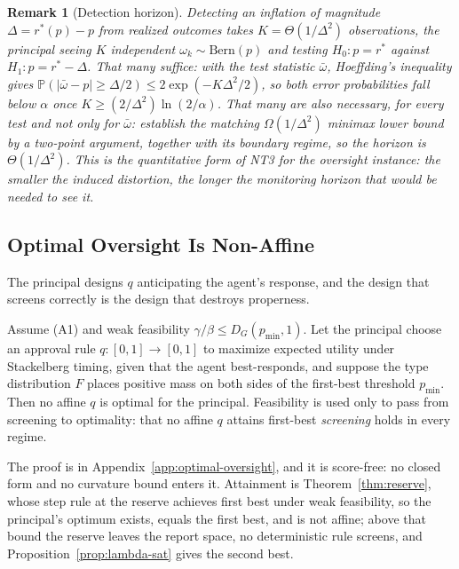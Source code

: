 \documentclass[acmsmall,nonacm,screen]{acmart}
\theoremstyle{acmplain}%
\theoremstyle{acmdefinition}%
\newtheorem{remark}[theorem]{Remark}%
\newcommand{\Prob}{\mathbb{P}}
\numberwithin{equation}{section}
\begin{document}
\begin{remark}[Detection horizon]\label{rem:detection-horizon}
Detecting an inflation of magnitude $\Delta = r^*(p) - p$ from realized outcomes takes $K = \Theta(1/\Delta^2)$ observations, the principal seeing $K$ independent $\omega_k \sim \mathrm{Bern}(p)$ and testing $H_0: p = r^*$ against $H_1: p = r^* - \Delta$. That many suffice: with the test statistic $\bar\omega$, Hoeffding's inequality \citep{hoeffding1963probability} gives $\Prob(|\bar\omega - p| \ge \Delta/2) \le 2\exp(-K\Delta^2/2)$, so both error probabilities fall below $\alpha$ once $K \ge (2/\Delta^2)\ln(2/\alpha)$. That many are also necessary, for every test and not only for $\bar\omega$: \citet{loven2026behavioral} establish the matching $\Omega(1/\Delta^2)$ minimax lower bound by a two-point argument, together with its boundary regime, so the horizon is $\Theta(1/\Delta^2)$. This is the quantitative form of NT3 for the oversight instance: the smaller the induced distortion, the longer the monitoring horizon that would be needed to see it.
\end{remark}

\subsection{Optimal Oversight Is Non-Affine}

The principal designs $q$ anticipating the agent's response, and the design that screens correctly is the design that destroys properness.

\begin{theorem}\label{thm:optimal-nonaffine}
Assume (A1) and weak feasibility $\gamma/\beta \le D_G(p_{\min},1)$. Let the principal choose an approval rule $q : [0,1] \to [0,1]$ to maximize expected utility under Stackelberg timing, given that the agent best-responds, and suppose the type distribution $F$ places positive mass on both sides of the first-best threshold $p_{\min}$. Then no affine $q$ is optimal for the principal. Feasibility is used only to pass from screening to optimality: that no affine $q$ attains first-best \emph{screening} holds in every regime.
\end{theorem}

The proof is in Appendix~\ref{app:optimal-oversight}, and it is score-free: no closed form and no curvature bound enters it. Attainment is Theorem~\ref{thm:reserve}, whose step rule at the reserve achieves first best under weak feasibility, so the principal's optimum exists, equals the first best, and is not affine; above that bound the reserve leaves the report space, no deterministic rule screens, and Proposition~\ref{prop:lambda-sat} gives the second best.
\end{document}
